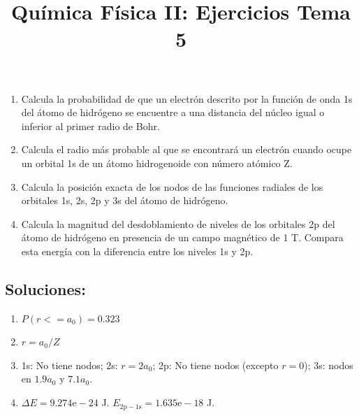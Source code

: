 \documentclass{tufte-handout}
\title[Química Física II: Ejercicios Tema 5]{
Química Física II: Ejercicios Tema 5}
\date{}  %
\begin{document}
\maketitle
\large 
\begin{enumerate}
    \item Calcula la probabilidad de que un electrón descrito por la
    función de onda 1s del átomo de hidrógeno se encuentre a una distancia del 
    núcleo igual o inferior al primer radio de Bohr.
    
    \item Calcula el radio más probable al que se encontrará un
    electrón cuando ocupe un orbital 1s de un átomo 
    hidrogenoide con número atómico Z.
    
    \item Calcula la posición exacta de los nodos de las funciones
    radiales de los orbitales 1s, 2s, 2p y 3s del átomo de hidrógeno.

    \item Calcula la magnitud del desdoblamiento de niveles de los orbitales
    2p del átomo de hidrógeno en presencia de un campo magnético de 1 T.
    Compara esta energía con la diferencia entre los niveles 1s y 2p.
\end{enumerate}

\newpage
\subsection{\textbf{Soluciones:}}
\begin{enumerate}
\item $P(r<=a_0)=0.323$
\item $r=a_0/Z$
\item 1s: No tiene nodos; 2s: $r=2a_0$; 2p: No tiene nodos (excepto $r=0$); 3s: nodos en $1.9a_0$ y $7.1a_0$.
\item  $\Delta E=9.274\mathrm{e}-24$ J. $E_\mathrm{2p-1s}=1.635\mathrm{e}-18$ J.
\end{enumerate}
\end{document}
